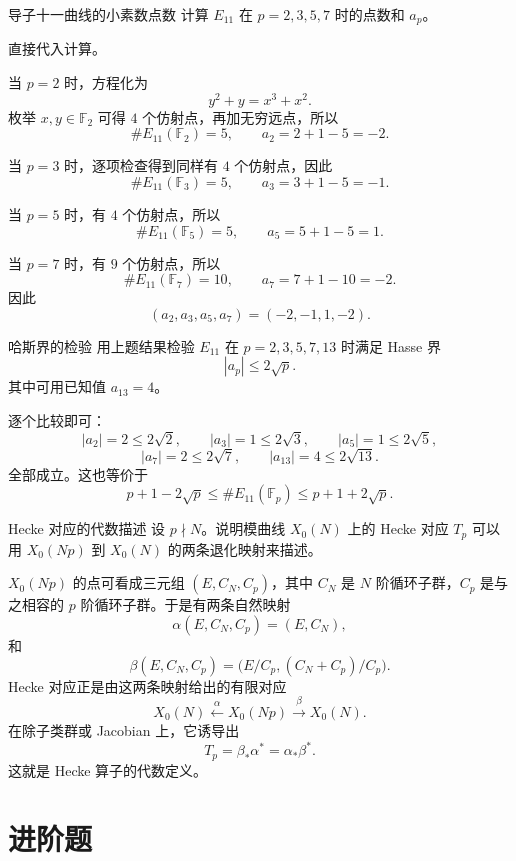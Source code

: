 \begin{problem}{导子十一曲线的小素数点数}
\easy
计算 $E_{11}$ 在 $p=2,3,5,7$ 时的点数和 $a_p$。
\end{problem}
\begin{solution}
直接代入计算。

当 $p=2$ 时，方程化为
\[
y^2+y=x^3+x^2.
\]
枚举 $x,y\in\mathbb{F}_2$ 可得 $4$ 个仿射点，再加无穷远点，所以
\[
\#E_{11}(\mathbb{F}_2)=5,
\qquad a_2=2+1-5=-2.
\]

当 $p=3$ 时，逐项检查得到同样有 $4$ 个仿射点，因此
\[
\#E_{11}(\mathbb{F}_3)=5,
\qquad a_3=3+1-5=-1.
\]

当 $p=5$ 时，有 $4$ 个仿射点，所以
\[
\#E_{11}(\mathbb{F}_5)=5,
\qquad a_5=5+1-5=1.
\]

当 $p=7$ 时，有 $9$ 个仿射点，所以
\[
\#E_{11}(\mathbb{F}_7)=10,
\qquad a_7=7+1-10=-2.
\]
因此
\[
(a_2,a_3,a_5,a_7)=(-2,-1,1,-2).
\]
\end{solution}

\begin{problem}{哈斯界的检验}
\easy
用上题结果检验 $E_{11}$ 在 $p=2,3,5,7,13$ 时满足 Hasse 界
\[
|a_p|\le 2\sqrt{p}.
\]
其中可用已知值 $a_{13}=4$。
\end{problem}
\begin{solution}
逐个比较即可：
\[
|a_2|=2\le 2\sqrt2,
\qquad
|a_3|=1\le 2\sqrt3,
\qquad
|a_5|=1\le 2\sqrt5,
\]
\[
|a_7|=2\le 2\sqrt7,
\qquad
|a_{13}|=4\le 2\sqrt{13}.
\]
全部成立。这也等价于
\[
p+1-2\sqrt p\le \#E_{11}(\mathbb{F}_p)\le p+1+2\sqrt p.
\]
\end{solution}

\begin{problem}{Hecke 对应的代数描述}
\easy
设 $p\nmid N$。说明模曲线 $X_0(N)$ 上的 Hecke 对应 $T_p$ 可以用 $X_0(Np)$ 到 $X_0(N)$ 的两条退化映射来描述。
\end{problem}
\begin{solution}
$X_0(Np)$ 的点可看成三元组 $(E,C_N,C_p)$，其中 $C_N$ 是 $N$ 阶循环子群，$C_p$ 是与之相容的 $p$ 阶循环子群。于是有两条自然映射
\[
\alpha(E,C_N,C_p)=(E,C_N),
\]
和
\[
\beta(E,C_N,C_p)=\bigl(E/C_p,(C_N+C_p)/C_p\bigr).
\]
Hecke 对应正是由这两条映射给出的有限对应
\[
X_0(N) \xleftarrow{\ \alpha\ } X_0(Np) \xrightarrow{\ \beta\ } X_0(N).
\]
在除子类群或 Jacobian 上，它诱导出
\[
T_p=\beta_*\alpha^*=
\alpha_*\beta^*.
\]
这就是 Hecke 算子的代数定义。
\end{solution}

\section{进阶题 \medium}

